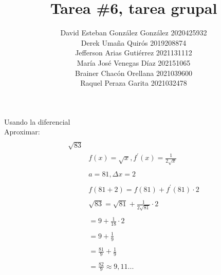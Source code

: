 \documentclass{article}
\title{Tarea \#6, tarea grupal}
\author{David Esteban González González 2020425932\\Derek Umaña Quirós
2019208874\\Jefferson Arias Gutiérrez 2021131112\\María José Venegas Díaz 
202151065\\Brainer Chacón Orellana 2021039600\\Raquel Peraza Garita 2021032478\\}
\theoremstyle{mytheoremstyle}
\theoremstyle{mytheoremstyle}
\theoremstyle{myproblemstyle}
\begin{document}
    \maketitle
    \large
    Usando la diferencial\\
    Aproximar:\\
    \begin{equation*} 
        \begin{split}
         \\\sqrt{83}\\
             &f(x)=\sqrt x, f^\prime(x)= \frac{1}{2 \sqrt x} \\
             \\
             &a=81, \varDelta x=2\\
             \\
             &f(81 + 2)=f(81)+f^\prime(81)\cdot 2\\
             \\
             &\sqrt{83} = \sqrt{81} + \frac{1}{2\sqrt{81}}\cdot 2 \\
             \\
             &=9+\frac{1}{18}\cdot 2\\
             \\
             &=9+\frac{1}{9}\\
             \\
             &=\frac{81}{9}+\frac{1}{9}\\
             \\
             &=\frac{82}{9}\approx 9,11...\\
        \end{split}
    \end{equation*}
\end{document}
